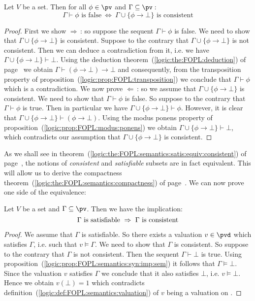 \begin{prop}\label{logic:prop:FOPL:semantics:consistent:sequent}
Let $V$ be a set. Then for all $\phi\in\pv$ and
$\Gamma\subseteq\pv$\,:
    \[
    \Gamma\vdash\phi\mbox{\ is false}\ \Leftrightarrow\
    \Gamma\cup\{\phi\to\bot\}\mbox{\ is consistent}
    \]
\end{prop}
\begin{proof}
First we show $\Rightarrow$\,: so suppose the sequent
$\Gamma\vdash\phi$ is false. We need to show that
$\Gamma\cup\{\phi\to\bot\}$ is consistent. Suppose to the contrary
that $\Gamma\cup\{\phi\to\bot\}$ is not consistent. Then we can
deduce a contradiction from it, i.e. we have
$\Gamma\cup\{\phi\to\bot\}\vdash\bot$. Using the deduction
theorem~(\ref{logic:the:FOPL:deduction}) of
page~\pageref{logic:the:FOPL:deduction} we obtain
$\Gamma\vdash(\phi\to\bot)\to\bot$ and consequently, from the
transposition property of
proposition~(\ref{logic:prop:FOPL:transposition}) we conclude that
$\Gamma\vdash\phi$ which is a contradiction. We now prove
$\Leftarrow$\,: so we assume that $\Gamma\cup\{\phi\to\bot\}$ is
consistent. We need to show that $\Gamma\vdash\phi$ is false. So
suppose to the contrary that $\Gamma\vdash\phi$ is true. Then in
particular we have $\Gamma\cup\{\phi\to\bot\}\vdash\phi$. However,
it is clear that $\Gamma\cup\{\phi\to\bot\}\vdash(\phi\to\bot)$.
Using the modus ponens property of
proposition~(\ref{logic:prop:FOPL:modus:ponens}) we obtain
$\Gamma\cup\{\phi\to\bot\}\vdash\bot$, which contradicts our
assumption that $\Gamma\cup\{\phi\to\bot\}$ is consistent.
\end{proof}

As we shall see in
theorem~(\ref{logic:the:FOPL:semantics:satis:equiv:consistent}) of
page~\pageref{logic:the:FOPL:semantics:satis:equiv:consistent}, the
notions of {\em consistent} and {\em satisfiable} subsets are in
fact equivalent. This will allow us to derive the compactness
theorem~(\ref{logic:the:FOPL:semantics:compactness}) of
page~\pageref{logic:the:FOPL:semantics:compactness}. We can now
prove one side of the equivalence:

\begin{prop}\label{logic:prop:FOPL:semantics:satis:imp:consistent}
Let $V$ be a set and $\Gamma\subseteq\pv$. Then we have the
implication:
    \[
    \Gamma\mbox{\ is satisfiable}\ \Rightarrow\ \Gamma\mbox{\
    is consistent}
    \]
\end{prop}
\begin{proof}
We assume that $\Gamma$ is satisfiable. So there exists a valuation
$v\in\pvd$ which satisfies $\Gamma$, i.e. such that $v\vDash\Gamma$.
We need to show that $\Gamma$ is consistent. So suppose to the
contrary that $\Gamma$ is not consistent. Then the sequent
$\Gamma\vdash\bot$ is true. Using
proposition~(\ref{logic:prop:FOPL:semantics:syn:imp:sem}) it follows
that $\Gamma\vDash\bot$. Since the valuation $v$ satisfies $\Gamma$
we conclude that it also satisfies $\bot$, i.e. $v\vDash\bot$. Hence
we obtain $v(\bot)=1$ which contradicts
definition~(\ref{logic:def:FOPL:semantics:valuation}) of $v$ being a
valuation on \pv.
\end{proof}

